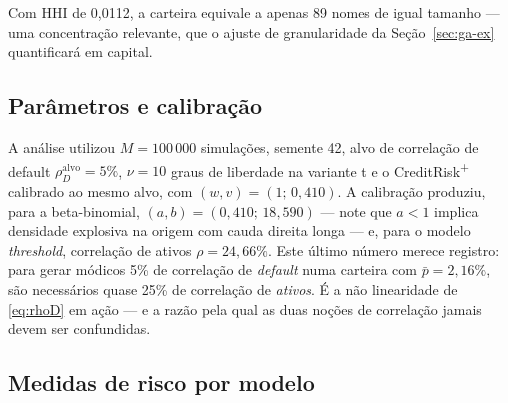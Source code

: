 \documentclass[11pt,a4paper]{article}
\begin{document}
Com HHI de 0{,}0112, a carteira equivale a apenas 89 nomes de igual tamanho --- uma concentração relevante, que o ajuste de granularidade da Seção~\ref{sec:ga-ex} quantificará em capital.

\subsection{Parâmetros e calibração}

A análise utilizou $M=100\,000$ simulações, semente 42, alvo de correlação de default $\rho_D^{\mathrm{alvo}}=5\%$, $\nu=10$ graus de liberdade na variante t e o CreditRisk\textsuperscript{+} calibrado ao mesmo alvo, com $(w,v)=(1;\,0{,}410)$. A calibração produziu, para a beta-binomial, $(a,b)=(0{,}410;\,18{,}590)$ --- note que $a<1$ implica densidade explosiva na origem com cauda direita longa --- e, para o modelo \emph{threshold}, correlação de ativos $\rho=24{,}66\%$. Este último número merece registro: para gerar módicos 5\% de correlação de \emph{default} numa carteira com $\bar p=2{,}16\%$, são necessários quase 25\% de correlação de \emph{ativos}. É a não linearidade de \eqref{eq:rhoD} em ação --- e a razão pela qual as duas noções de correlação jamais devem ser confundidas.

\subsection{Medidas de risco por modelo}
\end{document}
